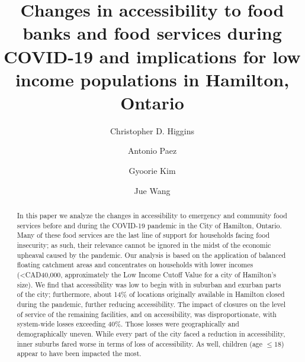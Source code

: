 \documentclass[]{elsarticle} %
\begin{document}
\begin{frontmatter}

  \title{Changes in accessibility to food banks and food services during
COVID-19 and implications for low income populations in Hamilton,
Ontario}
    \author[University of Toronto Scarborough]{Christopher D. Higgins}
    \author[McMaster University]{Antonio Paez}
    \author[University of Toronto Mississauga]{Gyoorie Kim}
    \author[University of Toronto Mississauga]{Jue Wang}
      \address[University of Toronto Scarborough]{Department of
Geography \& Planning, University of Toronto Scarborough, 1265 Military
Trail, Toronto, ON M1C1A4}
    \address[McMaster University]{School of Earth, Environment and
Society, McMaster University, Hamilton, ON, L8S 4K1, Canada}
    \address[University of Toronto Mississauga]{Department of Geography,
Geomatics and Environment, University of Toronto Mississauga, 3359
Mississauga Road, Mississauga, ON, L5L 1C6 , Canada}
  
  \begin{abstract}
  In this paper we analyze the changes in accessibility to emergency and
  community food services before and during the COVID-19 pandemic in the
  City of Hamilton, Ontario. Many of these food services are the last
  line of support for households facing food insecurity; as such, their
  relevance cannot be ignored in the midst of the economic upheaval
  caused by the pandemic. Our analysis is based on the application of
  balanced floating catchment areas and concentrates on households with
  lower incomes (\textless CAD40,000, approximately the Low Income
  Cutoff Value for a city of Hamilton's size). We find that
  accessibility was low to begin with in suburban and exurban parts of
  the city; furthermore, about 14\% of locations originally available in
  Hamilton closed during the pandemic, further reducing accessibility.
  The impact of closures on the level of service of the remaining
  facilities, and on accessibility, was disproportionate, with
  system-wide losses exceeding 40\%. Those losses were geographically
  and demographically uneven. While every part of the city faced a
  reduction in accessibility, inner suburbs fared worse in terms of loss
  of accessibility. As well, children (age \(\le 18\)) appear to have
  been impacted the most.
  \end{abstract}
  
 \end{frontmatter}
\end{document}
